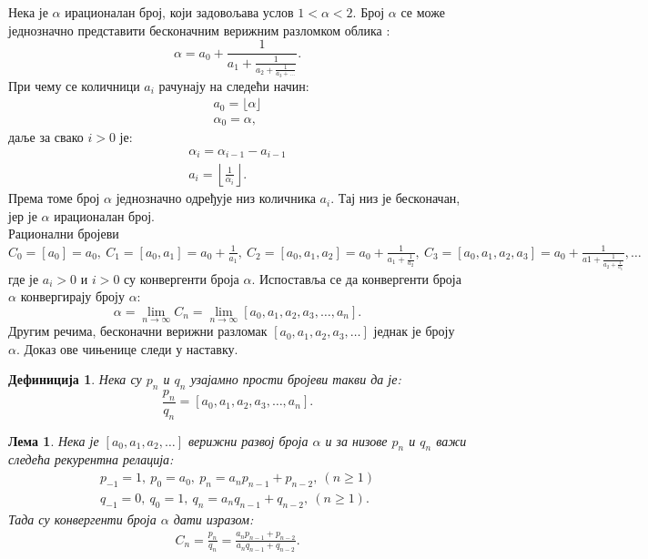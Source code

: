 \documentclass[a4paper]{article}
\newtheorem{lemma}{Лема}
\newtheorem{definition}{Дефиниција}
\begin{document}
Нека је $ \alpha $ ирационалан број, који задовољава услов $ 1 < \alpha < 2 $. Број $ \alpha $ се може једнозначно представити бесконачним верижним разломком облика \cite{hardy2008introduction, olds1963continued}:
\begin{displaymath}
	\alpha = a_{0} + \frac{1}{a_{1} + \frac{1}{a_{2} + \frac{1}{a_{3} + \ldots}}}.
\end{displaymath}
При чему се количници $ a_{i} $ рачунају на следећи начин:
\begin{eqnarray*}
	a_{0} = \lfloor \alpha \rfloor\\
	\alpha_{0} = \alpha,
\end{eqnarray*}
даље за свако $ i > 0 $ је:
\begin{eqnarray*}
	\alpha_{i} = \alpha_{i-1} - a_{i-1}\\
	a_{i} = \left\lfloor \frac{1}{\alpha_{i}} \right\rfloor.
\end{eqnarray*}
Према томе број $ \alpha $ једнозначно одређује низ количника $ a_{i} $. Тај низ је бесконачан, јер је $ \alpha $ ирационалан број.\\
Рационални бројеви $ C_{0} = [a_{0}] = a_{0},\ C_{1} = [a_{0}, a_{1}] = a_{0} + \frac{1}{a_{1}},\ C_{2} = [a_{0}, a_{1}, a_{2}] = a_{0} + \frac{1}{a_{1} + \frac{1}{a_{2}}},\ C_{3} = [a_{0}, a_{1}, a_{2}, a_{3}] = a_{0} + \frac{1}{a{1} + \frac{1}{a_{2} + \frac{1}{a_{3}}}}, \ldots $ где је $ a_{i} > 0 $ и $ i > 0 $ су конвергенти броја $ \alpha $.
Испоставља се да конвергенти броја $ \alpha $ конвергирају броју $ \alpha $:
\begin{displaymath}
	\alpha = \lim\limits_{n \rightarrow \infty} C_{n} = \lim\limits_{n \rightarrow \infty} [a_{0}, a_{1}, a_{2}, a_{3}, \ldots, a_{n}].
\end{displaymath}
Другим речима, бесконачни верижни разломак $ [a_{0}, a_{1}, a_{2}, a_{3}, \ldots] $ једнак је броју $ \alpha $. Доказ ове чињенице следи у наставку.

\begin{definition}
	\label{def:p_q_nizovi}
	Нека су $ p_{n} $ и $ q_{n} $ узајамно прости бројеви такви да је:
	\begin{displaymath}
		\frac{p_{n}}{q_{n}} = [a_{0}, a_{1}, a_{2}, a_{3}, \ldots, a_{n}].
	\end{displaymath}	
\end{definition}

\begin{lemma}
	\label{lemmma:p_q_nizovi}
	Нека је $ [a_{0}, a_{1}, a_{2}, \ldots] $ верижни развој броја $ \alpha $ и за низове $ p_{n} $ и $ q_{n} $ важи следећа рекурентна релација:
	\begin{eqnarray}
		p_{-1} = 1,\ p_{0} = a_{0},\ p_{n} = a_{n}p_{n-1} + p_{n-2},\ (n \geq 1 )\\
		q_{-1} = 0,\ q_{0} = 1,\ q_{n} = a_{n}q_{n-1} + q_{n-2},\ (n \geq 1 ).
	\end{eqnarray}
	Тада су конвергенти броја $ \alpha $ дати изразом:	
	\begin{eqnarray}
		C_{n} = \frac{p_{n}}{q_{n}} = \frac{a_{n}p_{n-1} + p_{n-2}}{a_{n}q_{n-1} + q_{n-2}}.
	\end{eqnarray}
\end{lemma}
\end{document}
